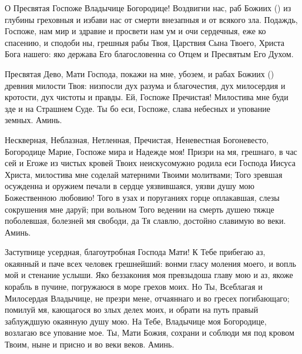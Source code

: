 \mychapterending


\begin{mymulticols}





О Пресвятая Госпоже Владычице Богородице! Воздвигни нас, раб Божиих () из глубины греховныя и избави нас от смерти внезапныя и от всякого зла. Подаждь, Госпоже, нам мир и здравие и просвети нам ум и очи сердечныя, еже ко спасению, и сподоби ны, грешныя рабы Твоя, Царствия Сына Твоего, Христа Бога нашего: яко держава Его благословенна со Отцем и Пресвятым Его Духом.




Пресвятая Дево, Мати Господа, покажи на мне, убозем, и рабах Божиих () древния милости Твоя: низпосли дух разума и благочестия, дух милосердия и кротости, дух чистоты и правды. Ей, Госпоже Пречистая! Милостива мне буди зде и на Страшнем Суде. Ты бо еси, Госпоже, слава небесных и упование земных. Аминь.




Нескверная, Неблазная, Нетленная, Пречистая, Неневестная Богоневесто, Богородице Марие, Госпоже мира и Надежде моя! Призри на мя, грешнаго, в час сей и Егоже из чистых кровей Твоих неискусомужно родила еси Господа Иисуса Христа, милостива мне соделай матерними Твоими молитвами; Того зревшая осужденна и оружием печали в сердце уязвившаяся, уязви душу мою Божественною любовию! Того в узах и поруганиях горце оплакавшая, слезы сокрушения мне даруй; при вольном Того ведении на смерть душею тяжце поболевшая, болезней мя свободи, да Тя славлю, достойно славимую во веки. Аминь.




Заступнице усердная, благоутробная Господа Мати! К Тебе прибегаю аз, окаянный и паче всех человек грешнейший: вонми гласу моления моего, и вопль мой и стенание услыши. Яко беззакония моя превзыдоша главу мою и аз, якоже корабль в пучине, погружаюся в море грехов моих. Но Ты, Всеблагая и Милосердая Владычице, не презри мене, отчаяннаго и во гресех погибающаго; помилуй мя, кающагося во злых делех моих, и обрати на путь правый заблуждшую окаянную душу мою. На Тебе, Владычице моя Богородице, возлагаю все упование мое. Ты, Мати Божия, сохрани и соблюди мя под кровом Твоим, ныне и присно и во веки веков. Аминь.



\end{mymulticols}
